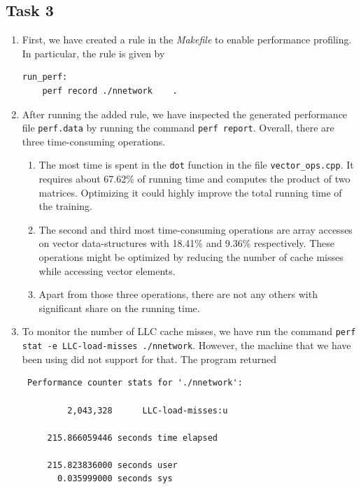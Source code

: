 \documentclass[a4paper, DIV12, headsepline]{scrartcl}
\begin{document}
\subsection*{Task 3}
\begin{enumerate}[label=(\alph*)]
\item First, we have created a rule in the \textit{Makefile} to enable performance profiling. In particular, the rule is given by
\begin{verbatim}
run_perf:
    perf record ./nnetwork    .
\end{verbatim}

\item After running the added rule, we have inspected the generated performance file \texttt{perf.data} by running the command \texttt{perf report}. Overall, there are three time-consuming operations.
\begin{enumerate}[label=(\arabic*)]
\item The most time is spent in the \texttt{dot} function in the file \texttt{vector\_ops.cpp}. It requires about 67.62\% of running time and computes the product of two matrices. Optimizing it could highly improve the total running time of the training.
\item The second and third most time-consuming operations are array accesses on vector data-structures with 18.41\% and 9.36\% respectively. These operations might be optimized by reducing the number of cache misses while accessing vector elements.
\item Apart from those three operations, there are not any others with significant share on the running time. 
\end{enumerate}

\item To monitor the number of LLC cache misses, we have run the command \texttt{perf stat -e LLC-load-misses ./nnetwork}. However, the machine that we have been using did not support for that. The program returned
\begin{verbatim}
 Performance counter stats for './nnetwork':

         2,043,328      LLC-load-misses:u

     215.866059446 seconds time elapsed

     215.823836000 seconds user
       0.035999000 seconds sys

\end{verbatim}

\end{enumerate}
\end{document}
